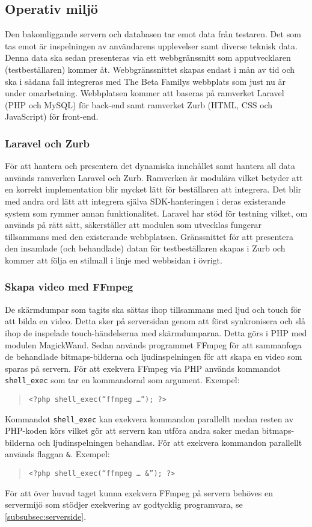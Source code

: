 \subsection{Operativ miljö}
Den bakomliggande servern och databasen tar emot data från testaren. Det som tas emot är inspelningen av användarens upplevelser samt diverse teknisk data. Denna data ska sedan presenteras via ett webbgränssnitt som apputvecklaren (testbeställaren) kommer åt. Webbgränssnittet skapas endast i mån av tid och ska i sådana fall integreras med The Beta Familys webbplats som just nu är under omarbetning. Webbplatsen kommer att baseras på ramverket Laravel (PHP och MySQL) för back-end samt ramverket Zurb (HTML, CSS och JavaScript) för front-end.

\subsubsection{Laravel och Zurb}
För att hantera och presentera det dynamiska innehållet samt hantera all data används ramverken Laravel och Zurb. Ramverken är modulära vilket betyder att en korrekt implementation blir mycket lätt för beställaren att integrera. Det blir med andra ord lätt att integrera själva SDK-hanteringen i deras existerande system som rymmer annan funktionalitet. Laravel har stöd för testning vilket, om används på rätt sätt, säkerställer att modulen som utvecklas fungerar tillsammans med den existerande webbplatsen. Gränssnittet för att presentera den insamlade (och behandlade) datan för testbeställaren skapas i Zurb och kommer att följa en stilmall i linje med webbsidan i övrigt.

\subsubsection{Skapa video med FFmpeg}
De skärmdumpar som tagits ska sättas ihop tillsammans med ljud och touch för att bilda en video. Detta sker på serversidan genom att först synkronisera och slå ihop de inspelade touch-händelserna med skärmdumparna. Detta görs i PHP med modulen MagickWand\parencite{magickwand}. Sedan används programmet FFmpeg\parencite{ffmpeg} för att sammanfoga de behandlade bitmaps-bilderna och ljudinspelningen för att skapa en video som sparas på servern. För att exekvera FFmpeg via PHP används kommandot \texttt{shell\_exec}\parencite{shellexec} som tar en kommandorad som argument. Exempel:
\begin{quote}
\texttt{<?php shell\_exec(``ffmpeg \dots''); ?>}
\end{quote}
Kommandot \texttt{shell\_exec} kan exekvera kommandon parallellt medan resten av PHP-koden körs vilket gör att servern kan utföra andra saker medan bitmaps-bilderna och ljudinspelningen behandlas. För att exekvera kommandon parallellt används flaggan \texttt{\&}. Exempel:
\begin{quote}
\texttt{<?php shell\_exec(``ffmpeg \dots~\textbf{\&}''); ?>}
\end{quote}
För att över huvud taget kunna exekvera FFmpeg på servern behöves en servermijö som stödjer exekvering av godtycklig programvara, se \ref{subsubsec:serverside}.